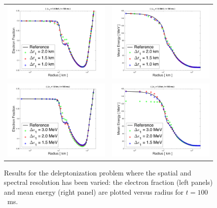 \documentclass[10pt,preprint]{aastex}
\begin{document}
\begin{figure}
  \begin{center}
    \begin{tabular}{cc}
      \includegraphics[width=.475\textwidth]{./Figures/DeleptonizationProblem1D_ElectronFraction_SpatialResolution.png} &
      \includegraphics[width=.475\textwidth]{./Figures/DeleptonizationProblem1D_MeanEnergy_SpatialResolution.png} \\
      \includegraphics[width=.475\textwidth]{./Figures/DeleptonizationProblem1D_ElectronFraction_SpectralResolution.png} &
      \includegraphics[width=.475\textwidth]{./Figures/DeleptonizationProblem1D_MeanEnergy_SpectralResolution.png}
    \end{tabular}
  \end{center}
  \caption{Results for the deleptonization problem where the spatial and spectral resolution has been varied: the electron fraction (left panels) and mean energy (right panel) are plotted versus radius for $t=100$~ms.}
  \label{fig:}
\end{figure}
\end{document}
